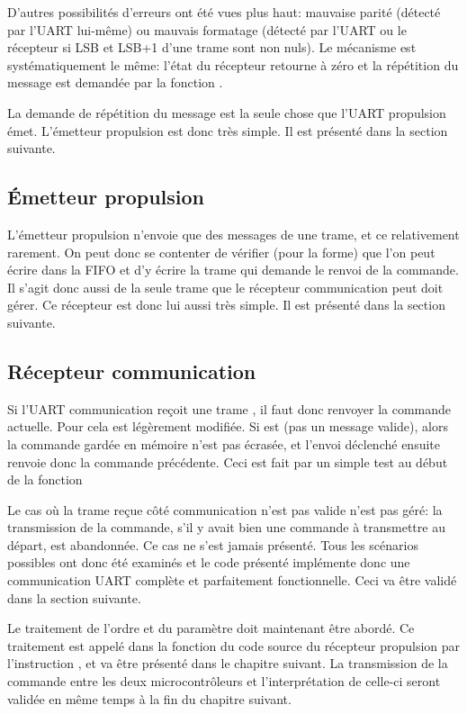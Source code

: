 D'autres possibilités d'erreurs ont été vues plus haut: mauvaise parité (détecté par l'UART lui-même) ou mauvais formatage (détecté par l'UART ou le récepteur si LSB et LSB+1 d'une trame sont non nuls). Le mécanisme est systématiquement le même: l'état du récepteur retourne à zéro et la répétition du message est demandée par la fonction .

La demande de répétition du message est la seule chose que l'UART propulsion émet. L'émetteur propulsion est donc très simple. Il est présenté dans la section suivante.

\subsection{\'Emetteur propulsion}
L'émetteur propulsion n'envoie que des messages de une trame, et ce relativement rarement. On peut donc se contenter de vérifier (pour la forme) que l'on peut écrire dans la FIFO et d'y écrire la trame  qui demande le renvoi de la commande. Il s'agit donc aussi de la seule trame que le récepteur communication peut doit gérer. Ce récepteur est donc lui aussi très simple. Il est présenté dans la section suivante.

\subsection{Récepteur communication}
Si l'UART communication reçoit une trame , il faut donc renvoyer la commande actuelle. Pour cela  est légèrement modifiée. Si  est  (pas un message valide), alors la commande gardée en mémoire n'est pas écrasée, et l'envoi déclenché ensuite renvoie donc la commande précédente. Ceci est fait par un simple test au début de la fonction 

Le cas où la trame reçue côté communication n'est pas valide n'est pas géré: la transmission de la commande, s'il y avait bien une commande à transmettre au départ, est abandonnée. Ce cas ne s'est jamais présenté. Tous les scénarios possibles ont donc été examinés et le code présenté implémente donc une communication UART complète et parfaitement fonctionnelle. Ceci va être validé dans la section suivante.

Le traitement de l'ordre et du paramètre doit maintenant être abordé. Ce traitement est appelé dans la fonction  du code source du récepteur propulsion par l'instruction , et va être présenté dans le chapitre suivant. La transmission de la commande entre les deux microcontrôleurs et l'interprétation de celle-ci seront validée en même temps à la fin du chapitre suivant.

